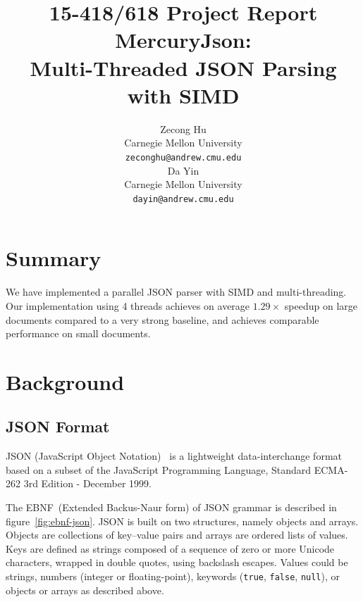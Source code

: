 \documentclass[11pt]{article}
\begin{document}
\title{15-418/618 Project Report \\
MercuryJson: \\
Multi-Threaded JSON Parsing with SIMD
}

\author{
	Zecong Hu \\
	Carnegie Mellon University \\
	{\tt zeconghu@andrew.cmu.edu} \\
	\And
	Da Yin \\
	Carnegie Mellon University \\
	{\tt dayin@andrew.cmu.edu}
}
\date{}

\maketitle

\section{Summary}
We have implemented a parallel JSON parser with SIMD and multi-threading. Our implementation using 4 threads achieves on average $1.29\times$ speedup on large documents compared to a very strong baseline, and achieves comparable performance on small documents.


\section{Background}

\subsection{JSON Format}

JSON (JavaScript Object Notation)~\cite{bray2017javascript, crockford2006application} is a lightweight data-interchange format based on a subset of the JavaScript Programming Language, Standard ECMA-262 3rd Edition - December 1999. 

The EBNF~(Extended Backus-Naur form) of JSON grammar is described in figure~\ref{fig:ebnf-json}. JSON is built on two structures, namely objects and arrays. Objects are collections of key--value pairs and arrays are ordered lists of values. Keys are defined as strings composed of a sequence of zero or more Unicode characters, wrapped in double quotes, using backslash escapes. Values could be strings, numbers (integer or floating-point), keywords (\texttt{true}, \texttt{false}, \texttt{null}), or objects or arrays as described above.
\end{document}
